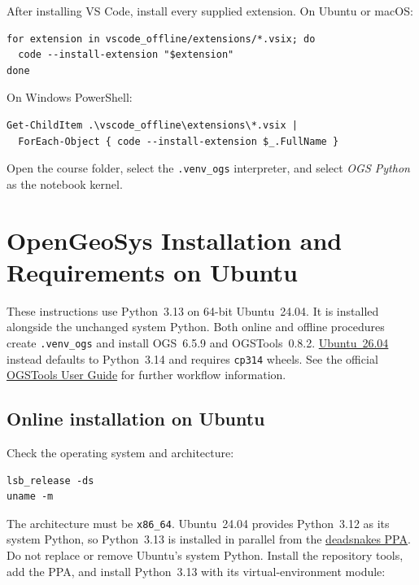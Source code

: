 \documentclass[11pt,a4paper]{tubaf-report}
\begin{document}
After installing VS Code, install every supplied extension. On Ubuntu or macOS:

\begin{lstlisting}[style=terminal]
for extension in vscode_offline/extensions/*.vsix; do
  code --install-extension "$extension"
done
\end{lstlisting}

On Windows PowerShell:

\begin{lstlisting}[style=terminal]
Get-ChildItem .\vscode_offline\extensions\*.vsix |
  ForEach-Object { code --install-extension $_.FullName }
\end{lstlisting}

Open the course folder, select the \texttt{.venv\_ogs} interpreter, and
select \emph{OGS Python} as the notebook kernel.

\chapter{OpenGeoSys Installation and Requirements on Ubuntu}
\label{chap:ubuntu-installation}

These instructions use Python~3.13 on 64-bit Ubuntu~24.04. It is installed
alongside the unchanged system Python. Both online and offline procedures create
\texttt{.venv\_ogs} and install OGS~6.5.9 and OGSTools~0.8.2.
\href{https://releases.ubuntu.com/}{Ubuntu~26.04} instead defaults to
Python~3.14 and requires \texttt{cp314} wheels. See the official
\href{https://ogstools.opengeosys.org/stable/user-guide/index.html}{OGSTools User Guide}
for further workflow information.

\section{Online installation on Ubuntu}

Check the operating system and architecture:

\begin{lstlisting}[style=terminal]
lsb_release -ds
uname -m
\end{lstlisting}

The architecture must be \texttt{x86\_64}. Ubuntu~24.04 provides Python~3.12
as its system Python, so Python~3.13 is installed in parallel from the
\href{https://launchpad.net/~deadsnakes/+archive/ubuntu/ppa}{deadsnakes PPA}.
Do not replace or remove Ubuntu's system Python. Install the repository tools,
add the PPA, and install Python~3.13 with its virtual-environment module:
\end{document}
